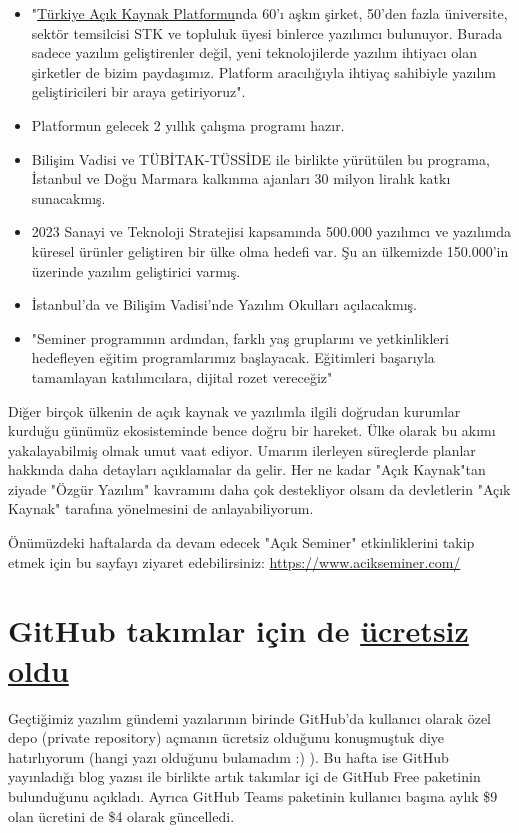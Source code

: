 \documentclass[11pt]{article}
\begin{document}
\begin{itemize}
\item "\href{https://www.turkiyeacikkaynakplatformu.com/}{Türkiye Açık Kaynak Platformu}nda 60'ı aşkın şirket, 50'den fazla
üniversite, sektör temsilcisi STK ve topluluk üyesi binlerce yazılımcı
bulunuyor. Burada sadece yazılım geliştirenler değil, yeni teknolojilerde
yazılım ihtiyacı olan şirketler de bizim paydaşımız. Platform aracılığıyla
ihtiyaç sahibiyle yazılım geliştiricileri bir araya getiriyoruz".
\item Platformun gelecek 2 yıllık çalışma programı hazır.
\item Bilişim Vadisi ve TÜBİTAK-TÜSSİDE ile birlikte yürütülen bu programa,
İstanbul ve Doğu Marmara kalkınma ajanları 30 milyon liralık katkı
sunacakmış.
\item 2023 Sanayi ve Teknoloji Stratejisi kapsamında 500.000 yazılımcı ve
yazılımda küresel ürünler geliştiren bir ülke olma hedefi var. Şu an
ülkemizde 150.000'in üzerinde yazılım geliştirici varmış.
\item İstanbul'da ve Bilişim Vadisi'nde Yazılım Okulları açılacakmış.
\item "Seminer programının ardından, farklı yaş gruplarını ve yetkinlikleri
hedefleyen eğitim programlarımız başlayacak. Eğitimleri başarıyla
tamamlayan katılımcılara, dijital rozet vereceğiz"
\end{itemize}

Diğer birçok ülkenin de açık kaynak ve yazılımla ilgili doğrudan kurumlar
kurduğu günümüz ekosisteminde bence doğru bir hareket. Ülke olarak bu akımı
yakalayabilmiş olmak umut vaat ediyor. Umarım ilerleyen süreçlerde planlar
hakkında daha detayları açıklamalar da gelir. Her ne kadar "Açık Kaynak"tan
ziyade "Özgür Yazılım" kavramını daha çok destekliyor olsam da devletlerin
"Açık Kaynak" tarafına yönelmesini de anlayabiliyorum.

Önümüzdeki haftalarda da devam edecek "Açık Seminer" etkinliklerini takip
etmek için bu sayfayı ziyaret edebilirsiniz: \url{https://www.acikseminer.com/}
\section{GitHub takımlar için de \href{https://github.blog/2020-04-14-github-is-now-free-for-teams/}{ücretsiz oldu}}
\label{sec:org365a0a5}
Geçtiğimiz yazılım gündemi yazılarının birinde GitHub'da kullanıcı olarak özel
depo (private repository) açmanın ücretsiz olduğunu konuşmuştuk diye
hatırlıyorum (hangi yazı olduğunu bulamadım :) ). Bu hafta ise GitHub
yayınladığı blog yazısı ile birlikte artık takımlar içi de GitHub Free
paketinin bulunduğunu açıkladı. Ayrıca GitHub Teams paketinin kullanıcı başına
aylık \$9 olan ücretini de \$4 olarak güncelledi.
\end{document}
